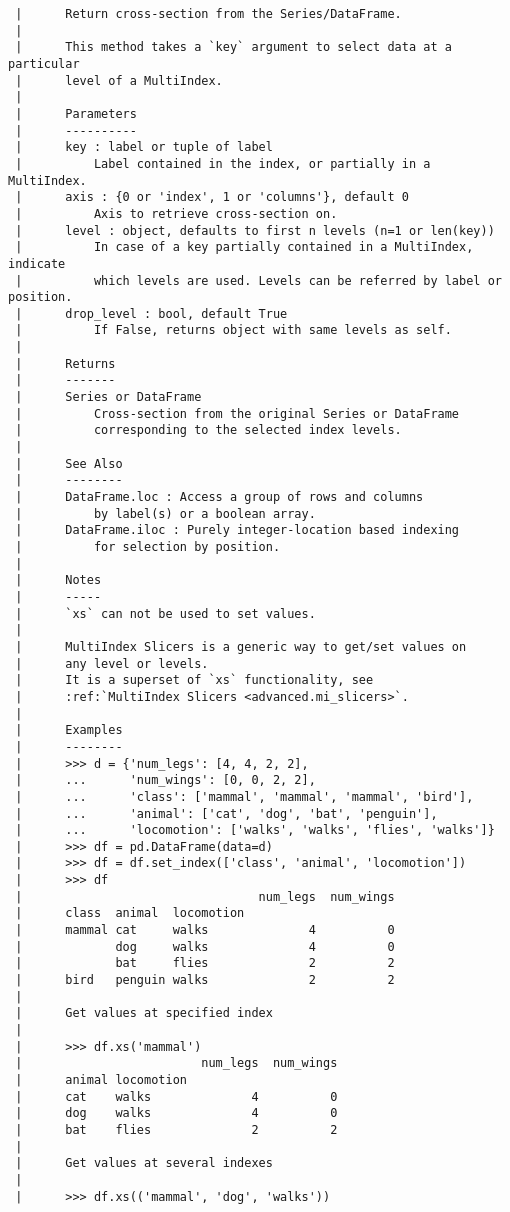 \documentclass[
  letterpaper,
  DIV=11,
  numbers=noendperiod]{scrreprt}
\begin{document}
\begin{verbatim}
 |      Return cross-section from the Series/DataFrame.
 |      
 |      This method takes a `key` argument to select data at a particular
 |      level of a MultiIndex.
 |      
 |      Parameters
 |      ----------
 |      key : label or tuple of label
 |          Label contained in the index, or partially in a MultiIndex.
 |      axis : {0 or 'index', 1 or 'columns'}, default 0
 |          Axis to retrieve cross-section on.
 |      level : object, defaults to first n levels (n=1 or len(key))
 |          In case of a key partially contained in a MultiIndex, indicate
 |          which levels are used. Levels can be referred by label or position.
 |      drop_level : bool, default True
 |          If False, returns object with same levels as self.
 |      
 |      Returns
 |      -------
 |      Series or DataFrame
 |          Cross-section from the original Series or DataFrame
 |          corresponding to the selected index levels.
 |      
 |      See Also
 |      --------
 |      DataFrame.loc : Access a group of rows and columns
 |          by label(s) or a boolean array.
 |      DataFrame.iloc : Purely integer-location based indexing
 |          for selection by position.
 |      
 |      Notes
 |      -----
 |      `xs` can not be used to set values.
 |      
 |      MultiIndex Slicers is a generic way to get/set values on
 |      any level or levels.
 |      It is a superset of `xs` functionality, see
 |      :ref:`MultiIndex Slicers <advanced.mi_slicers>`.
 |      
 |      Examples
 |      --------
 |      >>> d = {'num_legs': [4, 4, 2, 2],
 |      ...      'num_wings': [0, 0, 2, 2],
 |      ...      'class': ['mammal', 'mammal', 'mammal', 'bird'],
 |      ...      'animal': ['cat', 'dog', 'bat', 'penguin'],
 |      ...      'locomotion': ['walks', 'walks', 'flies', 'walks']}
 |      >>> df = pd.DataFrame(data=d)
 |      >>> df = df.set_index(['class', 'animal', 'locomotion'])
 |      >>> df
 |                                 num_legs  num_wings
 |      class  animal  locomotion
 |      mammal cat     walks              4          0
 |             dog     walks              4          0
 |             bat     flies              2          2
 |      bird   penguin walks              2          2
 |      
 |      Get values at specified index
 |      
 |      >>> df.xs('mammal')
 |                         num_legs  num_wings
 |      animal locomotion
 |      cat    walks              4          0
 |      dog    walks              4          0
 |      bat    flies              2          2
 |      
 |      Get values at several indexes
 |      
 |      >>> df.xs(('mammal', 'dog', 'walks'))

\end{verbatim}
\end{document}
